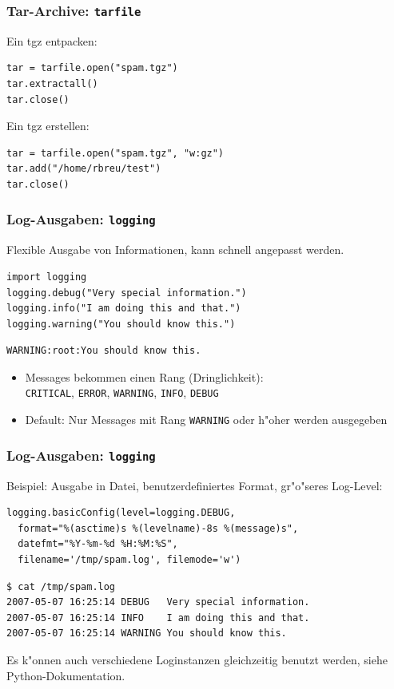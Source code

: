 \begin{frame}[fragile]
\frametitle{Tar-Archive: \texttt{tarfile}}
Ein tgz entpacken:
\begin{lstlisting}[style=Python]
tar = tarfile.open("spam.tgz")
tar.extractall()
tar.close()
\end{lstlisting}
\vspace*{3mm}
Ein tgz erstellen:
\begin{lstlisting}[style=Python]
tar = tarfile.open("spam.tgz", "w:gz")
tar.add("/home/rbreu/test")
tar.close()
\end{lstlisting}
\end{frame}

\begin{frame}[fragile]
\frametitle{Log-Ausgaben: \texttt{logging}}
Flexible Ausgabe von Informationen, kann schnell angepasst werden.
\begin{lstlisting}[style=Python]
import logging
logging.debug("Very special information.")
logging.info("I am doing this and that.")
logging.warning("You should know this.")
\end{lstlisting}
\begin{lstlisting}[style=shell]
WARNING:root:You should know this.
\end{lstlisting}
\begin{itemize}
\item Messages bekommen einen Rang (Dringlichkeit):\\
 \texttt{CRITICAL}, \texttt{ERROR}, \texttt{WARNING}, \texttt{INFO}, \texttt{DEBUG}
\item Default: Nur Messages mit Rang \texttt{WARNING} oder h"oher werden ausgegeben
\end{itemize}
\end{frame}

\begin{frame}[fragile]
\frametitle{Log-Ausgaben: \texttt{logging}}
Beispiel: Ausgabe in Datei, benutzerdefiniertes Format, gr"o"seres Log-Level:
\begin{lstlisting}[style=Python, basicstyle=\ttfamily\small]
logging.basicConfig(level=logging.DEBUG,
  format="%(asctime)s %(levelname)-8s %(message)s",
  datefmt="%Y-%m-%d %H:%M:%S",
  filename='/tmp/spam.log', filemode='w')
\end{lstlisting}
\begin{lstlisting}[style=Shell, basicstyle=\ttfamily\small]
$ cat /tmp/spam.log
2007-05-07 16:25:14 DEBUG   Very special information.
2007-05-07 16:25:14 INFO    I am doing this and that.
2007-05-07 16:25:14 WARNING You should know this.
\end{lstlisting} %
Es k"onnen auch verschiedene Loginstanzen gleichzeitig benutzt werden,
siehe Python-Dokumentation.
\end{frame}

